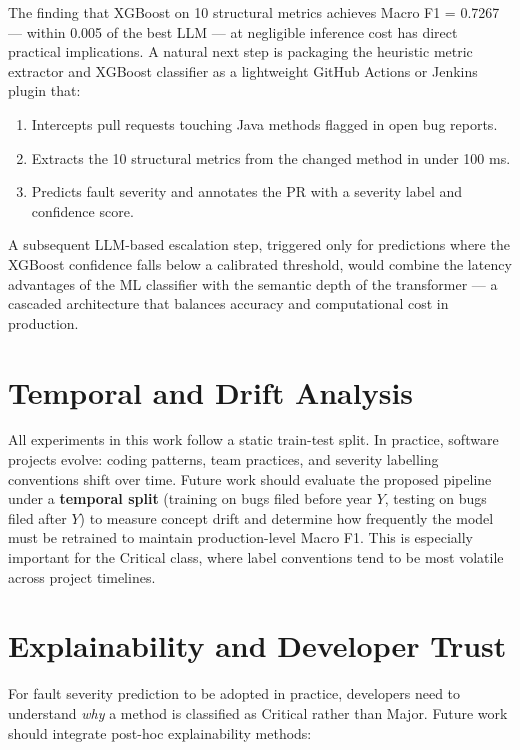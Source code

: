 \documentclass[12pt, a4paper]{report}
\begin{document}
The finding that XGBoost on 10 structural metrics achieves Macro F1 = 0.7267
--- within 0.005 of the best LLM --- at negligible inference cost has direct
practical implications. A natural next step is packaging the heuristic metric
extractor and XGBoost classifier as a lightweight GitHub Actions or Jenkins
plugin that:

\begin{enumerate}[leftmargin=1.5cm]
  \item Intercepts pull requests touching Java methods flagged in open bug
  reports.
  \item Extracts the 10 structural metrics from the changed method in under
  100 ms.
  \item Predicts fault severity and annotates the PR with a severity label
  and confidence score.
\end{enumerate}

A subsequent LLM-based escalation step, triggered only for predictions where
the XGBoost confidence falls below a calibrated threshold, would combine the
latency advantages of the ML classifier with the semantic depth of the
transformer --- a cascaded architecture that balances accuracy and
computational cost in production.

\section{Temporal and Drift Analysis}

All experiments in this work follow a static train-test split. In practice,
software projects evolve: coding patterns, team practices, and severity
labelling conventions shift over time. Future work should evaluate the
proposed pipeline under a \textbf{temporal split} (training on bugs filed
before year $Y$, testing on bugs filed after $Y$) to measure concept drift
and determine how frequently the model must be retrained to maintain
production-level Macro F1. This is especially important for the Critical
class, where label conventions tend to be most volatile across project
timelines.

\section{Explainability and Developer Trust}

For fault severity prediction to be adopted in practice, developers need to
understand \textit{why} a method is classified as Critical rather than Major.
Future work should integrate post-hoc explainability methods:
\end{document}
